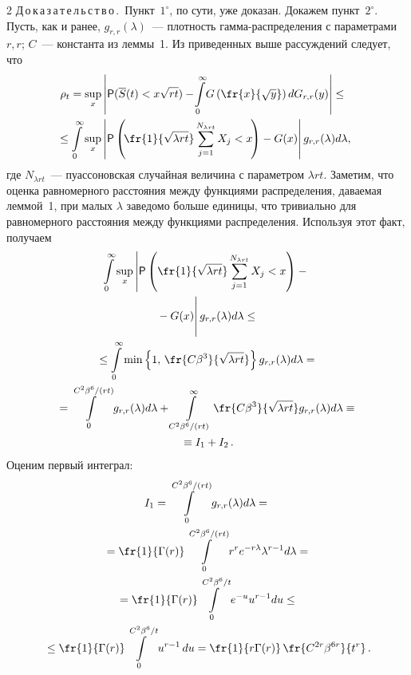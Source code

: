 \begin{multicols}{2}
\noindent
Д\,о\,к\,а\,з\,а\,т\,е\,л\,ь\,с\,т\,в\,о\,.~Пункт~$1^{\circ}$, по сути, уже
доказан. Докажем пункт~$2^{\circ}$. Пусть, как и ранее,
$g_{r,r}(\lambda)$~--- плотность гам\-ма-рас\-пре\-де\-ле\-ния с параметрами
$r,r$; $C$~--- константа из леммы~1. Из приведенных выше рассуждений
следует, что
\begin{multline*}
\hspace*{-6pt}\rho_t=\sup\limits_x\left\vert{\sf P}(\overline
S(t)<x\sqrt{rt})-\!\int\limits_{0}^{\infty}\!
G\left(\fr{x}{\sqrt{y}}\right)dG_{r,r}(y)\right\vert\le{}
\\
\hspace*{-6pt}{}\le \int\limits_0^{\infty}\sup\limits_x \left\vert{\sf
P}\left(\!\fr{1}{\sqrt{\lambda rt}}\sum\limits_{j=1}^{N_{\lambda rt}}X_j<x
\!\right)-G(x)\right\vert g_{r,r}(\lambda)d\lambda,
\end{multline*}
где $N_{\lambda rt}$~--- пуассоновская случайная величина с
параметром $\lambda rt$. Заметим, что оценка равномерного расстояния
между функциями распределения, даваемая леммой~1, при малых
$\lambda$ заведомо больше единицы, что тривиально для равномерного
расстояния между функциями распределения. Используя этот факт,
получаем
\begin{multline*}
\int\limits_0^{\infty}\sup\limits_x \left\vert{\sf P}\left(\fr{1}{\sqrt{\lambda
rt}}\sum\limits_{j=1}^{N_{\lambda rt}}X_j<x
\right)-{}\right.\\
\left.{}-G(x)\vphantom{\sum\limits_{j=1}^N}\right\vert g_{r,r}(\lambda)d\lambda\le{}\\
{}\le
\int\limits_0^{\infty} \min\left\{1,\, \fr{C\beta^3}{\sqrt{\lambda
r t}}\right\} g_{r,r}(\lambda) d\lambda={}
\\
{}=\int\limits_0^{C^2\beta^6/(rt)}g_{r,r}(\lambda)
d\lambda+\int\limits_{C^2\beta^6/(rt)}^{\infty}\fr{C\beta^3}{\sqrt{\lambda
r t}} g_{r,r}(\lambda) d\lambda \equiv{}\\
{}\equiv I_1+I_2\,.
\end{multline*}
Оценим первый интеграл:
\begin{multline*}
I_1 =\int\limits_0^{C^2\beta^6/(rt)}g_{r,r}(\lambda)
d\lambda={}\\
{}=\fr{1}{\Gamma(r)}\int\limits_0^{C^2\beta^6/(rt)}r^r
e^{-r\lambda} \lambda^{r-1}d\lambda={}
\\
{}=\fr{1}{\Gamma(r)}\int\limits_0^{C^2\beta^6/t}e^{-u}u^{r-1}du \le{}\\
{}\le
\fr{1}{\Gamma(r)}\int\limits_0^{C^2\beta^6/t}u^{r-1}\,du
=\fr{1}{r\Gamma(r)}\,\fr{C^{2r}\beta^{6r}}{t^r}\,.
\end{multline*}

\end{multicols}
